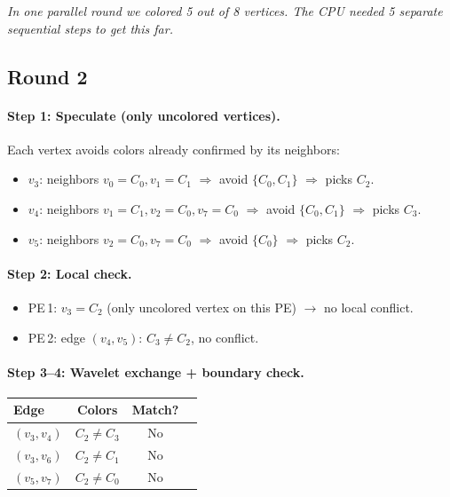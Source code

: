 \documentclass[11pt,letterpaper]{article}
\begin{document}
\medskip
\noindent\emph{In one parallel round we colored 5 out of 8 vertices. The CPU needed 5 separate sequential steps to get this far.}

\subsection{Round 2}

\paragraph{Step 1: Speculate (only uncolored vertices).}
Each vertex avoids colors already confirmed by its neighbors:
\begin{itemize}[nosep]
  \item $v_3$: neighbors $v_0{=}C_0, v_1{=}C_1$ $\Rightarrow$ avoid $\{C_0,C_1\}$ $\Rightarrow$ picks $C_2$.
  \item $v_4$: neighbors $v_1{=}C_1, v_2{=}C_0, v_7{=}C_0$ $\Rightarrow$ avoid $\{C_0,C_1\}$ $\Rightarrow$ picks $C_3$.
  \item $v_5$: neighbors $v_2{=}C_0, v_7{=}C_0$ $\Rightarrow$ avoid $\{C_0\}$ $\Rightarrow$ picks $C_2$.
\end{itemize}

\paragraph{Step 2: Local check.}
\begin{itemize}[nosep]
  \item PE\,1: $v_3{=}C_2$ (only uncolored vertex on this PE) $\rightarrow$ no local conflict.
  \item PE\,2: edge $(v_4,v_5)$: $C_3 \neq C_2$, no conflict.
\end{itemize}

\paragraph{Step 3--4: Wavelet exchange + boundary check.}
\begin{center}
\begin{tabular}{lccl}
\toprule
Edge & Colors & Match? \\
\midrule
$(v_3,v_4)$ & $C_2 \neq C_3$ & \textcolor{confirmGreen}{No} \\
$(v_3,v_6)$ & $C_2 \neq C_1$ & \textcolor{confirmGreen}{No} \\
$(v_5,v_7)$ & $C_2 \neq C_0$ & \textcolor{confirmGreen}{No} \\
\bottomrule
\end{tabular}
\end{center}
\end{document}

